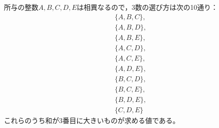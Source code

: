 \documentclass{article}
\begin{document}
所与の整数$A, B, C, D, E$は相異なるので，3数の選び方は次の10通り：
\begin{eqnarray*}
    &\{A, B, C\}, \\
    &\{A, B, D\}, \\
    &\{A, B, E\}, \\
    &\{A, C, D\}, \\
    &\{A, C, E\}, \\
    &\{A, D, E\}, \\
    &\{B, C, D\}, \\
    &\{B, C, E\}, \\
    &\{B, D, E\}, \\
    &\{C, D, E\}
\end{eqnarray*}
これらのうち和が3番目に大きいものが求める値である。
\end{document}
